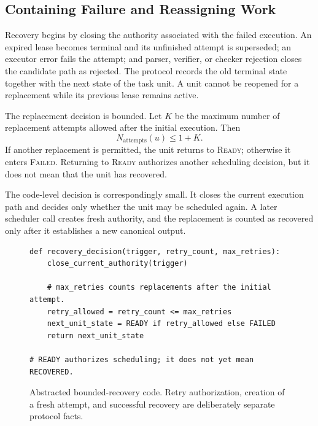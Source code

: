\documentclass{article}
\theoremstyle{plain}
\begin{document}
\subsection{Containing Failure and Reassigning Work}
\label{subsec:containment-reassignment}

Recovery begins by closing the authority associated with the failed execution. An expired lease becomes terminal and its unfinished attempt is superseded; an executor error fails the attempt; and parser, verifier, or checker rejection closes the candidate path as rejected. The protocol records the old terminal state together with the next state of the task unit. A unit cannot be reopened for a replacement while its previous lease remains active.

The replacement decision is bounded. Let $K$ be the maximum number of replacement attempts allowed after the initial execution. Then
\begin{equation}
N_{\mathrm{attempts}}(u)\leq 1+K.
\label{eq:retry-limit-balanced}
\end{equation}
If another replacement is permitted, the unit returns to \textsc{Ready}; otherwise it enters \textsc{Failed}. Returning to \textsc{Ready} authorizes another scheduling decision, but it does not mean that the unit has recovered.

The code-level decision is correspondingly small. It closes the current execution path and decides only whether the unit may be scheduled again. A later scheduler call creates fresh authority, and the replacement is counted as recovered only after it establishes a new canonical output.

\begin{figure}[!h]
\centering
\begin{minipage}{0.94\linewidth}
\small
\begin{verbatim}
def recovery_decision(trigger, retry_count, max_retries):
    close_current_authority(trigger)

    # max_retries counts replacements after the initial attempt.
    retry_allowed = retry_count <= max_retries
    next_unit_state = READY if retry_allowed else FAILED
    return next_unit_state

# READY authorizes scheduling; it does not yet mean RECOVERED.
\end{verbatim}
\end{minipage}
\caption{Abstracted bounded-recovery code. Retry authorization, creation of a fresh attempt, and successful recovery are deliberately separate protocol facts.}
\label{fig:recovery-code-balanced}
\end{figure}
\end{document}
